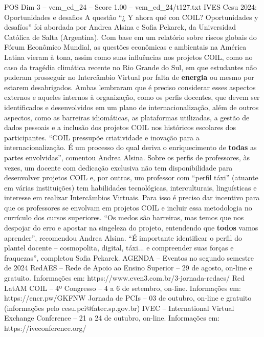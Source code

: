 \begin{textsample}{POS Dim 3 – vem\_ed\_24 – Score 1.00 – vem\_ed\_24/t127.txt}  \label{ex:f3_pos_076}
IVES Cesu 2024: Oportunidades e desafios A questão “¿ Y ahora qué con COIL?
Oportunidades y desafíos” foi abordada por Andrea Alsina e Sofia Pekarek, da Universidad Católica de Salta (Argentina).
Com base em um relatório sobre riscos globais do Fórum Econômico Mundial, as questões econômicas e ambientais na América Latina vieram à tona, assim como suas influências nos projetos COIL, como no caso da tragédia climática recente no Rio Grande do Sul, em que estudantes não puderam prosseguir no Intercâmbio Virtual por falta de \textbf{energia} ou mesmo por estarem desabrigados.
Ambas lembraram que é preciso considerar esses aspectos externos e aqueles internos à organização, como os perfis docentes, que devem ser identificados e desenvolvidos em um plano de internacionalização, além de outros aspectos, como as barreiras idiomáticas, as plataformas utilizadas, a gestão de dados pessoais e a inclusão dos projetos COIL nos históricos escolares dos participantes. “COIL pressupõe criatividade e inovação para a internacionalização.
É um processo do qual deriva o enriquecimento de \textbf{todas} as partes envolvidas”, comentou Andrea Alsina.
Sobre os perfis de professores, às vezes, um docente com dedicação exclusiva não tem disponibilidade para desenvolver projetos COIL e, por outras, um professor com “perfil táxi” (atuante em várias instituições) tem habilidades tecnológicas, interculturais, linguísticas e interesse em realizar Intercâmbios Virtuais.
Para isso é preciso dar incentivo para que os professores se envolvam em projetos COIL e incluir essa metodologia no currículo dos cursos superiores. “Os medos são barreiras, mas temos que nos despojar do erro e apostar na singeleza do projeto, entendendo que \textbf{todos} vamos aprender”, recomendou Andrea Alsina. “É importante identificar o perfil do plantel docente – cosmopolita, digital, táxi... e compreender suas forças e fraquezas”, completou Sofia Pekarek.
AGENDA – Eventos no segundo semestre de 2024 RedAES – Rede de Apoio ao Ensino Superior – 29 de agosto, on-line e gratuito.
Informações em: https://www.even3.com.br/3-jornada-redaes/ Red LatAM COIL – 4º Congresso – 4 a 6 de setembro, on-line.
Informações em: https://encr.pw/GKFNW Jornada de PCIs – 03 de outubro, on-line e gratuito (informações pelo cesu.pci@fatec.sp.gov.br) IVEC – International Virtual Exchange Conference – 21 a 24 de outubro, on-line.
Informações em: https://iveconference.org/

\end{textsample}
